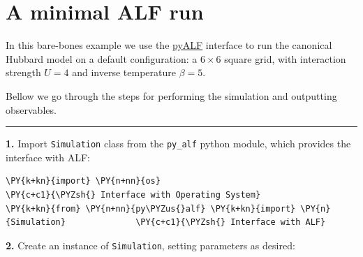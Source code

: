     
    

    
    \hypertarget{a-minimal-alf-run}{%
\section{A minimal ALF run}\label{a-minimal-alf-run}}

    In this bare-bones example we use the
\href{https://git.physik.uni-wuerzburg.de/ALF/pyALF/-/tree/ALF-2.2}{pyALF}
interface to run the canonical Hubbard model on a default configuration:
a \(6\times6\) square grid, with interaction strength \(U=4\) and
inverse temperature \(\beta = 5\).

Bellow we go through the steps for performing the simulation and
outputting observables.

\begin{center}\rule{0.5\linewidth}{0.5pt}\end{center}

\textbf{1.} Import \texttt{Simulation} class from the \texttt{py\_alf}
python module, which provides the interface with ALF:

    \begin{tcolorbox}[breakable, size=fbox, boxrule=1pt, pad at break*=1mm,colback=cellbackground, colframe=cellborder]
\begin{Verbatim}[commandchars=\\\{\}]
\PY{k+kn}{import} \PY{n+nn}{os}                                  \PY{c+c1}{\PYZsh{} Interface with Operating System}
\PY{k+kn}{from} \PY{n+nn}{py\PYZus{}alf} \PY{k+kn}{import} \PY{n}{Simulation}              \PY{c+c1}{\PYZsh{} Interface with ALF}
\end{Verbatim}
\end{tcolorbox}

    \textbf{2.} Create an instance of \texttt{Simulation}, setting
parameters as desired:

